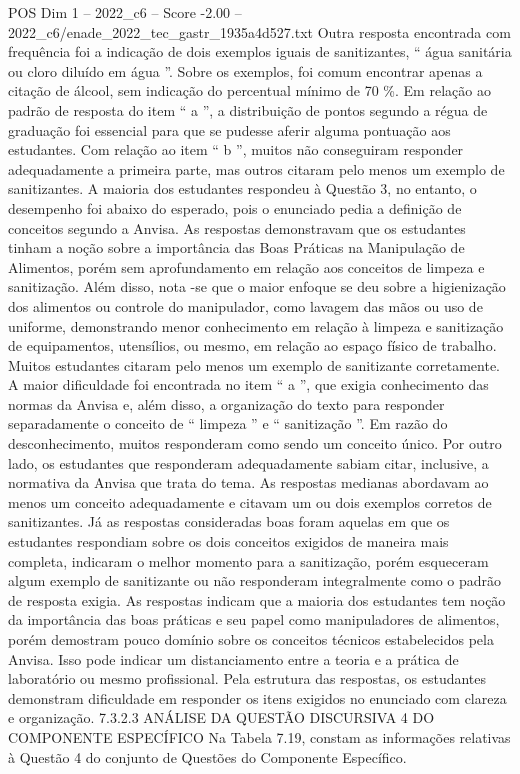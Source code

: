 \begin{textsample}{POS Dim 1 – 2022\_c6 – Score -2.00 – 2022\_c6/enade\_2022\_tec\_gastr\_1935a4d527.txt}
Outra resposta encontrada com frequência foi a indicação de dois exemplos iguais de sanitizantes, “ água sanitária ou cloro diluído em água ”.
Sobre os exemplos, foi comum encontrar apenas a citação de álcool, sem indicação do percentual mínimo de 70 \%.
Em relação ao padrão de resposta do item “ a ”, a distribuição de pontos segundo a régua de graduação foi essencial para que se pudesse aferir alguma pontuação aos estudantes.
Com relação ao item “ b ”, muitos não conseguiram responder adequadamente a primeira parte, mas outros citaram pelo menos um exemplo de sanitizantes.
A maioria dos estudantes respondeu à Questão 3, no entanto, o desempenho foi abaixo do esperado, pois o enunciado pedia a definição de conceitos segundo a Anvisa.
As respostas demonstravam que os estudantes tinham a noção sobre a importância das Boas Práticas na Manipulação de Alimentos, porém sem aprofundamento em relação aos conceitos de limpeza e sanitização.
Além disso, nota -se que o maior enfoque se deu sobre a higienização dos alimentos ou controle do manipulador, como lavagem das mãos ou uso de uniforme, demonstrando menor conhecimento em relação à limpeza e sanitização de equipamentos, utensílios, ou mesmo, em relação ao espaço físico de trabalho.
Muitos estudantes citaram pelo menos um exemplo de sanitizante corretamente.
A maior dificuldade foi encontrada no item “ a ”, que exigia conhecimento das normas da Anvisa e, além disso, a organização do texto para responder separadamente o conceito de “ limpeza ” e “ sanitização ”.
Em razão do desconhecimento, muitos responderam como sendo um conceito único.
Por outro lado, os estudantes que responderam adequadamente sabiam citar, inclusive, a normativa da Anvisa que trata do tema.
As respostas medianas abordavam ao menos um conceito adequadamente e citavam um ou dois exemplos corretos de sanitizantes.
Já as respostas consideradas boas foram aquelas em que os estudantes respondiam sobre os dois conceitos exigidos de maneira mais completa, indicaram o melhor momento para a sanitização, porém esqueceram algum exemplo de sanitizante ou não responderam integralmente como o padrão de resposta exigia.
As respostas indicam que a maioria dos estudantes tem noção da importância das boas práticas e seu papel como manipuladores de alimentos, porém demostram pouco domínio sobre os conceitos técnicos estabelecidos pela Anvisa.
Isso pode indicar um distanciamento entre a teoria e a prática de laboratório ou mesmo profissional.
Pela estrutura das respostas, os estudantes demonstram dificuldade em responder os itens exigidos no enunciado com clareza e organização. 7.3.2.3 ANÁLISE DA QUESTÃO DISCURSIVA 4 DO COMPONENTE ESPECÍFICO Na Tabela 7.19, constam as informações relativas à Questão 4 do conjunto de Questões do Componente Específico.

\end{textsample}
